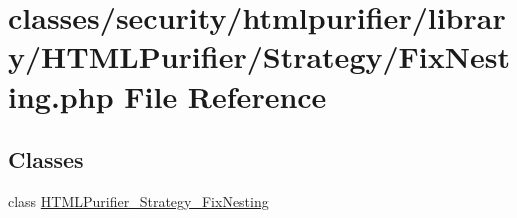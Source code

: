 \hypertarget{FixNesting_8php}{\section{classes/security/htmlpurifier/library/\+H\+T\+M\+L\+Purifier/\+Strategy/\+Fix\+Nesting.php File Reference}
\label{FixNesting_8php}
}
\subsection*{Classes}
\begin{DoxyCompactItemize}
\item 
class \hyperlink{classHTMLPurifier__Strategy__FixNesting}{H\+T\+M\+L\+Purifier\+\_\+\+Strategy\+\_\+\+Fix\+Nesting}
\end{DoxyCompactItemize}
